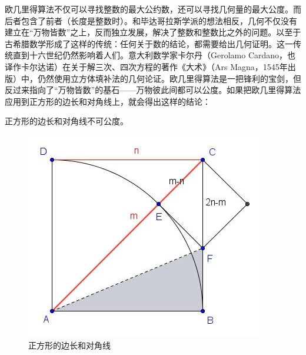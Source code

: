 \documentclass[b5paper]{ctexart}
\begin{document}
欧几里得算法不仅可以寻找整数的最大公约数，还可以寻找几何量的最大公度。而后者包含了前者（长度是整数时）。和毕达哥拉斯学派的想法相反，几何不仅没有建立在“万物皆数”之上，反而独立发展，解决了整数和整数比之外的问题。以至于古希腊数学形成了这样的传统：任何关于数的结论，都需要给出几何证明。这一传统直到十六世纪仍然影响着人们。意大利数学家卡尔丹（Gerolamo Cardano，也译作卡尔达诺）在关于解三次、四次方程的著作《大术》（Ars Magna，1545年出版）中，仍然使用立方体填补法的几何论证\cite{HanXueTao2009}。欧几里得算法是一把锋利的宝剑，但反过来指向了“万物皆数”的基石——万物彼此间都可以公度。如果把欧几里得算法应用到正方形的边长和对角线上，就会得出这样的结论：

\begin{proposition}
正方形的边长和对角线不可公度。
\end{proposition}

\begin{figure}[htbp]
 \centering
 \includegraphics[scale=1.5]{img/irrational}
 \caption{正方形的边长和对角线}
 \label{fig:irrational}
\end{figure}
\end{document}
